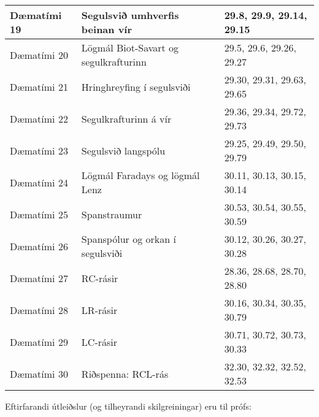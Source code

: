 \begin{table}[H]
\begin{tabular}{|l|l|l|}
        Dæmatími 19 & Segulsvið umhverfis beinan vír & 29.8, 29.9, 29.14, 29.15 \\ \hline
        Dæmatími 20 & Lögmál Biot-Savart og segulkrafturinn & 29.5, 29.6, 29.26, 29.27   \\ \hline
        Dæmatími 21 & Hringhreyfing í segulsviði  & 29.30, 29.31, 29.63, 29.65 \\ \hline 
        Dæmatími 22 & Segulkrafturinn á vír &  29.36, 29.34, 29.72, 29.73  \\ \hline
        Dæmatími 23 & Segulsvið langspólu & 29.25, 29.49, 29.50, 29.79  \\ \hline
        Dæmatími 24 & Lögmál Faradays og lögmál Lenz & 30.11, 30.13, 30.15, 30.14  \\ \hline
        Dæmatími 25 & Spanstraumur & 30.53, 30.54, 30.55, 30.59 \\ \hline
        Dæmatími 26 & Spanspólur og orkan í segulsviði & 30.12, 30.26, 30.27, 30.28 \\ \hline
        Dæmatími 27 & RC-rásir  & 28.36, 28.68, 28.70, 28.80  \\ \hline
        Dæmatími 28 & LR-rásir  & 30.16, 30.34, 30.35, 30.79 \\ \hline
        Dæmatími 29 & LC-rásir & 30.71, 30.72, 30.73, 30.33 \\ \hline
        Dæmatími 30 & Riðspenna: RCL-rás & 32.30, 32.32, 32.52, 32.53 \\ \hline
    \end{tabular}
\end{table}


Eftirfarandi útleiðslur (og tilheyrandi skilgreiningar) eru til prófs:



